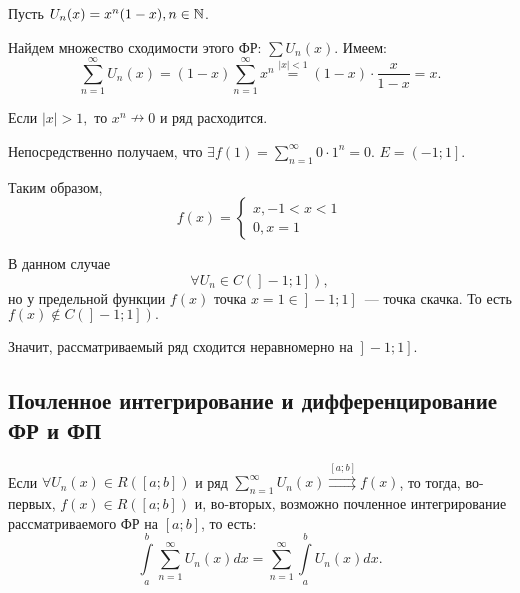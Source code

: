 \documentclass[../../main.tex]{subfiles}
\begin{document}
\begin{exmp}
	Пусть $U_n(x) = x^n(1 - x), n \in \mathbb{N}$.
	
	Найдем множество сходимости этого ФР: $\sum U_n(x)$. Имеем:
	\[
	\sum_{n = 1}^{\infty} U_n(x) = (1 - x)\sum_{n = 1}^{\infty} x^n \overset{|x| 
	< 1}{=} (1 - x) \cdot \frac{x}{1 - x} = x.
	\]
	
	Если $|x| > 1,$ то $x^n \nrightarrow 0$ и ряд расходится.
	
	Непосредственно получаем, что $\exists f(1) = \sum\limits_{n = 1}^{\infty} 0 
	\cdot 1^n = 0.$
	$E = \left.\left(-1; 1\right.\right].$ 
	
	Таким образом, 
	\[
	f(x) =
	\begin{cases}
	x, -1 < x < 1 \\
	0, x = 1
	\end{cases}
	\]
	
	В данном случае \[\forall U_n \in C(\left.\left.\right] -1; 1 \right]),\] но 
	у предельной функции $f(x)$ точка $x = 1 \in \left.\left.\right] -1; 1 
	\right] $~--- точка скачка.	
	То есть 
	$f(x) \notin  C(\left.\left.\right] -1; 1 \right]).$ 
	
	Значит, рассматриваемый ряд сходится неравномерно на $\left.\left.\right] -1; 
	1 \right].$
\end{exmp}


\subsection{Почленное интегрирование и дифференцирование ФР и ФП}

\begin{thm}
	Если $\forall U_n(x) \in R([a; b])$  и ряд $\sum\limits_{n = 1}^{\infty} 
	U_n(x) \overset{[a; b]}{\rightrightarrows} f(x)$, то тогда, во-первых, $f(x) 
	\in R([a; b])$ и, во-вторых, возможно почленное интегрирование 
	рассматриваемого ФР на $[a; b]$, то есть:
	\begin{equation} \label{eq:19}
	\int\limits_{a}^{b} \sum\limits_{n = 1}^{\infty}  U_n(x) dx = \sum\limits_{n 
	= 1}^{\infty}  \int\limits_{a}^{b} U_n(x) dx.
	\end{equation}
	
\end{thm}
\end{document}
